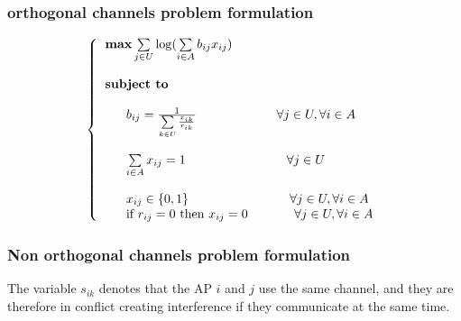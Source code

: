 \documentclass[journal,transmag]{IEEEtran}
\begin{document}
\subsubsection{orthogonal channels problem formulation}
\begin{footnotesize}
\begin{equation}
\left\{
\begin{tabular}{l} 
$\textbf{max}  \sum\limits_{j \in U} \log (\sum\limits_{i \in A} b_{ij} x_{ij}) $ \\         
\\
\textbf{subject to} \\

\\
~~~~~$ b_{ij}= \frac{1}{\sum\limits_{k \in U} \frac{x_{ik}}{r_{ik}}} $ ~~~~~~~~~~~~~~~~~ $\forall j \in U,  \forall i \in A $  \\

\\
~~~~~$ \sum\limits_{i \in A} x_{ij} = 1 $ ~~~~~~~~~~~~~~~~~~~~~~ $\forall j \in U $  \\

\\
~~~~~$ x_{ij} \in \{0,1 \} $ ~~~~~~~~~~~~~~~~~~~~~~ $\forall j \in U,  \forall i \in A $  \\

~~~~~if $r_{ij}=0$ then $x_{ij}=0$  ~~~~~~~~~ $\forall j \in U,  \forall i \in A $  \\


\end{tabular}
\right.
\end{equation}
\end{footnotesize}

\subsubsection{Non orthogonal channels problem formulation}
The variable $s_{ik}$ denotes that the AP $i$ and $j$ use the same channel, and they are therefore in conflict creating interference if they communicate at the same time.
\end{document}
